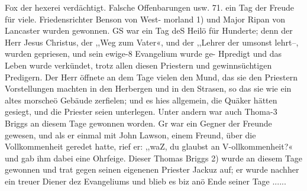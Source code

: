 Fox der hexerei verdächtigt. Falsche Offenbarungen usw. 71.
ein Tag der Freude für viele. Friedensrichter Benson von West-
morland 1) und Major Ripan von Lancaster wurden gewonnen.
GS war ein Tag deS Heilö für Hunderte; denn der Herr Jesus
Christus, der ,,Weg zum Vater«, und der ,,Lehrer der umsonst
lehrt--, wurden gepriesen, und sein ewige-8 Evangelium wurde ge-
Hpredigt und das Leben wurde verkündet, trotz allen diesen Priestern
und gewinnsüchtigen Predigern. Der Herr öffnete an dem Tage
vielen den Mund, das sie den Priestern Vorstellungen machten
in den Herbergen und in den Strasen, so das sie wie ein altes
morscheö Gebäude zerfielen; und es hies allgemein, die Quäker
hätten gesiegt, und die Priester seien unterlegen. Unter andern
war auch Thoma-3 Briggs an diesem Tage gewonnen worden. Gr
war ein Gegner der Freunde gewesen, und als er einmal mit
John Lawson, einem Freund, über die Vollkommenheit geredet hatte,
rief er: ,,waZ, du glaubst an V-ollkommenheit?« und gab ihm dabei
eine Ohrfeige. Dieser Thomas Briggs 2) wurde an diesem Tage
gewonnen und trat gegen seinen eigenenen Priester Jackuz auf; er
wurde nachher ein treuer Diener dez Evangeliums und blieb es
biz anö Ende seiner Tage ......
